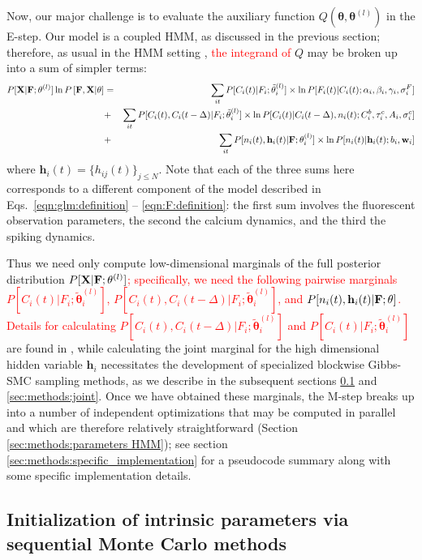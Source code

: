 \documentclass[aoas,preprint]{imsart}
\providecommand{\tr}[1]{\textcolor{red}{#1}}
\newcommand{\bth}{\mathbf{\theta}}
\newcommand{\w}{w}
\newcommand{\bw}{\mathbf{\w}}
\newcommand{\bF}{{\bf F}}
\newcommand{\bX}{{\bf X}}
\newcommand{\bh}{\mathbf{h}}
\newcommand{\tbth}{\tilde{\bth}}
\begin{document}
Now, our major challenge is to evaluate the auxiliary function $Q(\bth,\bth^{(l)})$ in the E-step. Our model is a coupled HMM, as discussed in the previous section; therefore, as usual in the HMM setting \cite{RAB89}, \tr{the integrand of} $Q$ may be broken up into a sum of simpler terms:
\tr{\begin{eqnarray}
P[\bX | \bF; \bth^{(l)}] \ln P \left[ \bF, \bX | \bth \right] 
&=& \sum_{it} P[C_i(t) | F_i; \tbth_i^{(l)}] \times \ln
P[F_i(t)|C_i(t); \alpha_i, \beta_i, \gamma_i, \sigma^F_i] \nonumber \\
&+& \sum_{it} P[C_i(t), C_i(t-\Delta) | F_i; \tbth_i^{(l)}] \times \ln
P[C_i(t)|C_i(t-\Delta), n_i(t); C^b_i, \tau^c_i, A_i, \sigma^c_i]
\nonumber 
\\ &+& \sum_{it} P[n_i(t), \bh_i(t) | \bF; \bth_i^{(l)}] \times \ln
P[n_i(t)| \bh_i(t); b_i, \bw_i]
\label{eqn:loglik:definition-expl}
\end{eqnarray}}
\noindent where $\bh_i(t)=\{h_{ij}(t)\}_{j \leq N}$. Note that each of
the three sums here corresponds to a different component of the model
described in Eqs.~\eqref{eqn:glm:definition} --
\eqref{eqn:F:definition}: the first sum involves the fluorescent
observation parameters, the second the calcium dynamics, and the third
the spiking dynamics.

Thus we need only compute low-dimensional marginals of the full
posterior distribution \tr{$P[\bX | \bF; \bth^{(l)}]$; specifically, we need
the following pairwise marginals $P[C_i(t)| F_i; \tbth_i^{(l)}]$, $P[C_i(t), C_i(t- \Delta) | F_i; \tbth_i^{(l)}]$, and $P[n_i(t),\bh_i(t) | \bF; \bth]$.  Details for calculating $P[C_i(t), C_i(t- \Delta) | F_i;
\tbth_i^{(l)}]$ and $P[C_i(t)|F_i;\tbth_i^{(l)}]$} are found in
\cite{Vogelstein2009}, while calculating the joint marginal for the
high dimensional hidden variable $\bh_i$ necessitates the development
of specialized blockwise Gibbs-SMC sampling methods, as we describe in
the subsequent sections \ref{sec:methods:indep} and
\ref{sec:methods:joint}. Once we have obtained these marginals, the
M-step breaks up into a number of independent optimizations that may
be computed in parallel and which are therefore relatively
straightforward (Section \ref{sec:methods:parameters HMM}); see
section \ref{sec:methods:specific_implementation} for a pseudocode
summary along with some specific implementation details.

\subsection{Initialization of intrinsic parameters via sequential
  Monte Carlo methods} \label{sec:methods:indep}
\end{document}
